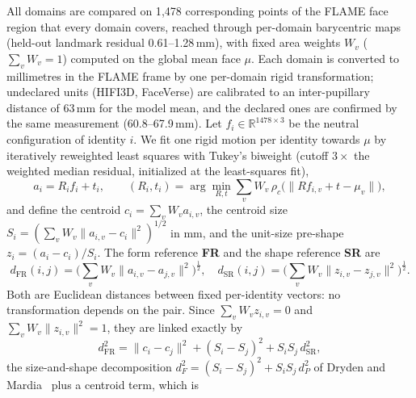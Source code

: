 All domains are compared on 1{,}478 corresponding points of the FLAME face
region that every domain covers, reached through per-domain barycentric maps
(held-out landmark residual 0.61--1.28\,mm), with fixed area weights $W_v$
($\sum_v W_v=1$) computed on the global mean face $\mu$.
Each domain is converted to millimetres in the FLAME frame by one per-domain
rigid transformation; undeclared units (HIFI3D, FaceVerse) are calibrated to
an inter-pupillary distance of 63\,mm for the model mean, and the declared
ones are confirmed by the same measurement (60.8--67.9\,mm).
Let $f_i\in\mathbb{R}^{1478\times3}$ be the neutral configuration of identity
$i$. We fit one rigid motion per identity towards $\mu$ by iteratively
reweighted least squares with Tukey's biweight (cutoff $3\times$ the weighted
median residual, initialized at the least-squares fit),
\begin{equation}
a_i = R_i f_i + t_i,\qquad
(R_i,t_i)=\arg\min_{R,t}\sum_v W_v\,\rho_c\big(\|Rf_{i,v}+t-\mu_v\|\big),
\label{eq:robust_rigid}
\end{equation}
and define the centroid $c_i=\sum_v W_v a_{i,v}$, the centroid size
$S_i=(\sum_v W_v\|a_{i,v}-c_i\|^2)^{1/2}$ in mm, and the unit-size pre-shape
$z_i=(a_i-c_i)/S_i$. The form reference \textbf{FR} and the shape reference
\textbf{SR} are
\begin{equation}
d_{\mathrm{FR}}(i,j)=\Big(\sum_v W_v\|a_{i,v}-a_{j,v}\|^2\Big)^{\frac12},\quad
d_{\mathrm{SR}}(i,j)=\Big(\sum_v W_v\|z_{i,v}-z_{j,v}\|^2\Big)^{\frac12}.
\label{eq:fr_sr}
\end{equation}
Both are Euclidean distances between fixed per-identity vectors: no
transformation depends on the pair. Since $\sum_v W_v z_{i,v}=0$ and
$\sum_v W_v\|z_{i,v}\|^2=1$, they are linked exactly by
\begin{equation}
d_{\mathrm{FR}}^2=\|c_i-c_j\|^2+(S_i-S_j)^2+S_iS_j\,d_{\mathrm{SR}}^2,
\label{eq:size_shape}
\end{equation}
the size-and-shape decomposition $d_F^2=(S_i-S_j)^2+S_iS_j\,d_P^2$ of
Dryden and Mardia~\cite{dryden2016statistical} plus a centroid term, which is
